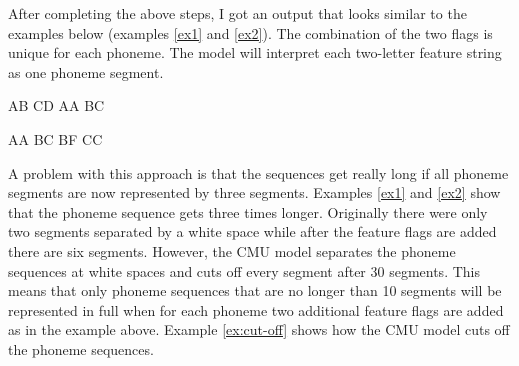 After completing the above steps, I got an output that looks similar to the examples below (examples \ref{ex1} and \ref{ex2}). The combination of the two flags is unique for each phoneme.  The model will interpret each two-letter feature string as one phoneme segment.

\begin{covexamples}
\item \label{ex1}  AB CD  AA BC
\item \label{ex2}  AA BC   BF CC
\end{covexamples}

A problem with this approach is that the sequences get really long if all phoneme segments are now represented by three segments.  Examples \ref{ex1} and \ref{ex2} show that the phoneme sequence gets three times longer. Originally there were only two segments separated by a white space while after the feature flags are added there are six segments. However, the CMU model separates the  phoneme sequences at white spaces and cuts off every segment after 30 segments. This means that only phoneme sequences that are no longer than 10 segments will be represented in full when for each phoneme two additional feature flags are added as in the example above. Example \ref{ex:cut-off} shows how the CMU model cuts off the phoneme sequences.

